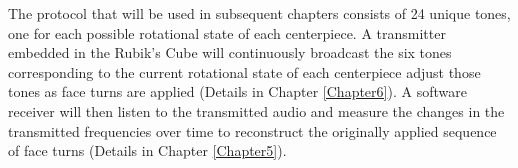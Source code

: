 The protocol that will be used in subsequent chapters consists of 24 unique tones, one for each possible rotational state of each centerpiece.
A transmitter embedded in the Rubik's Cube will continuously broadcast the six tones corresponding to the current rotational state of each centerpiece adjust those tones as face turns are applied (Details in Chapter \ref{Chapter6}).
A software receiver will then listen to the transmitted audio and measure the changes in the transmitted frequencies over time to reconstruct the originally applied sequence of face turns (Details in Chapter \ref{Chapter5}).
